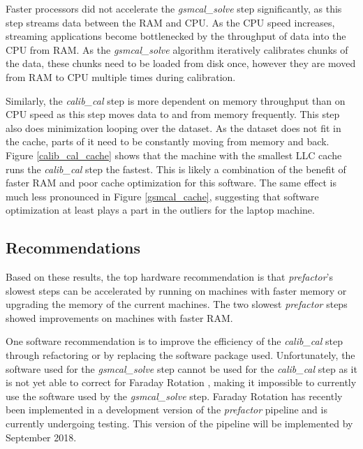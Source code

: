 Faster processors did not accelerate the \textit{gsmcal\_solve} step significantly, as this step streams data between the RAM and CPU. As the CPU speed increases, streaming applications become bottlenecked by the throughput of data into the CPU from RAM. As the \textit{gsmcal\_solve} algorithm iteratively calibrates chunks of the data, these chunks need to be loaded from disk once, however they are moved from RAM to CPU multiple times during calibration. 

Similarly, the \textit{calib\_cal} step is more dependent on memory throughput than on CPU speed as this step moves data to and from memory frequently. This step also does minimization looping over the dataset. As the dataset does not fit in the cache, parts of it need to be constantly moving from memory and back. Figure \ref{calib_cal_cache} shows that the machine with the smallest LLC cache runs the \textit{calib\_cal} step the fastest. This is likely a combination of the benefit of faster RAM and poor cache optimization for this software. The same effect is much less pronounced in Figure \ref{gsmcal_cache}, suggesting that software optimization at least plays a part in the outliers for the laptop machine. 

\subsection{Recommendations}
Based on these results, the top hardware recommendation is that \textit{prefactor}'s slowest steps can be accelerated by running on machines with faster memory or upgrading the memory of the current machines. The two slowest \textit{prefactor} steps showed improvements on machines with faster RAM.  

One software recommendation is to improve the efficiency of the \textit{calib\_cal} step through refactoring or by replacing the software package used. Unfortunately, the software used for the \textit{gsmcal\_solve} step cannot be used for the \textit{calib\_cal} step as it is not yet able to  correct for Faraday Rotation \citep{stefcal}, making it impossible to currently use the software used by the \textit{gsmcal\_solve} step. Faraday Rotation has recently been implemented in a development version of the \textit{prefactor} pipeline and is currently undergoing testing. This version of the pipeline will be implemented by September 2018.

